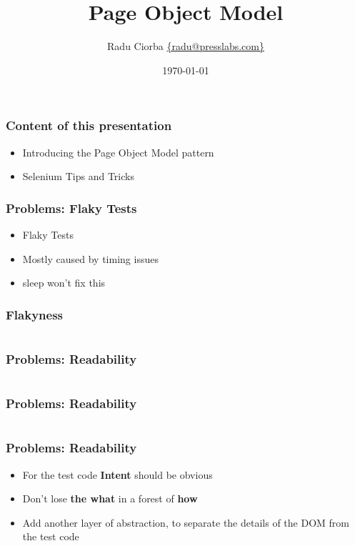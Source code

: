\documentclass{beamer}
\title[Selenium Page Object Model]{Page Object Model} %
\author{Radu Ciorba \href{mailto:radu@presslabs.com}{\{radu@presslabs.com\}}} %
\date{\today} %
\begin{document}
\begin{frame}
  \titlepage %
\end{frame}

\begin{frame}
  \frametitle{Content of this presentation}
  \begin{itemize}
  \item Introducing the Page Object Model pattern
  \item Selenium Tips and Tricks
  \end{itemize}
\end{frame}

\begin{frame}
  \frametitle{Problems: Flaky Tests}
  \begin{itemize}
  \item Flaky Tests
  \item Mostly caused by timing issues
  \item sleep won't fix this
  \end{itemize}
\end{frame}

\begin{frame}
  \frametitle{Flakyness}
  \inputminted[fontsize=\footnotesize]{python}{snippets/waits.py}

\end{frame}

\begin{frame}
  \frametitle{Problems: Readability}
   {\fontsize{8.5pt}{8.5pt}
     \inputminted{python}{snippets/before.py}
   }
\end{frame}

\begin{frame}
  \frametitle{Problems: Readability}
   {\fontsize{8.5pt}{8.5pt}
     \inputminted{python}{snippets/after.py}
   }
\end{frame}

\begin{frame}
  \frametitle{Problems: Readability}
  \begin{itemize}
  \item For the test code \textbf{Intent} should be obvious
  \item Don't lose \textbf{the what} in a forest of \textbf{how}
  \item Add another layer of abstraction, to separate the details of the DOM from the test code
  \end{itemize}
\end{frame}
\end{document}
